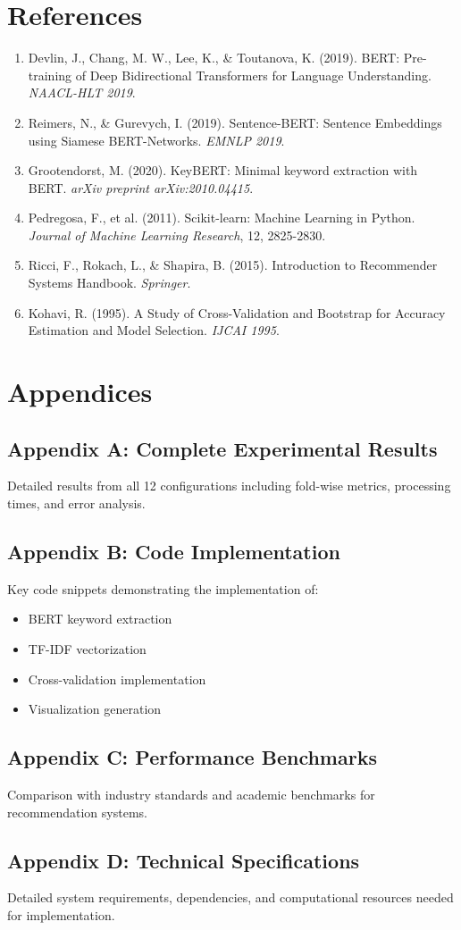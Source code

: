 \documentclass[12pt,a4paper]{article}
\begin{document}
\section{References}

\begin{enumerate}
    \item Devlin, J., Chang, M. W., Lee, K., \& Toutanova, K. (2019). BERT: Pre-training of Deep Bidirectional Transformers for Language Understanding. \textit{NAACL-HLT 2019}.
    
    \item Reimers, N., \& Gurevych, I. (2019). Sentence-BERT: Sentence Embeddings using Siamese BERT-Networks. \textit{EMNLP 2019}.
    
    \item Grootendorst, M. (2020). KeyBERT: Minimal keyword extraction with BERT. \textit{arXiv preprint arXiv:2010.04415}.
    
    \item Pedregosa, F., et al. (2011). Scikit-learn: Machine Learning in Python. \textit{Journal of Machine Learning Research}, 12, 2825-2830.
    
    \item Ricci, F., Rokach, L., \& Shapira, B. (2015). Introduction to Recommender Systems Handbook. \textit{Springer}.
    
    \item Kohavi, R. (1995). A Study of Cross-Validation and Bootstrap for Accuracy Estimation and Model Selection. \textit{IJCAI 1995}.
\end{enumerate}

\section{Appendices}

\subsection{Appendix A: Complete Experimental Results}
Detailed results from all 12 configurations including fold-wise metrics, processing times, and error analysis.

\subsection{Appendix B: Code Implementation}
Key code snippets demonstrating the implementation of:
\begin{itemize}
    \item BERT keyword extraction
    \item TF-IDF vectorization
    \item Cross-validation implementation
    \item Visualization generation
\end{itemize}

\subsection{Appendix C: Performance Benchmarks}
Comparison with industry standards and academic benchmarks for recommendation systems.

\subsection{Appendix D: Technical Specifications}
Detailed system requirements, dependencies, and computational resources needed for implementation.
\end{document}
